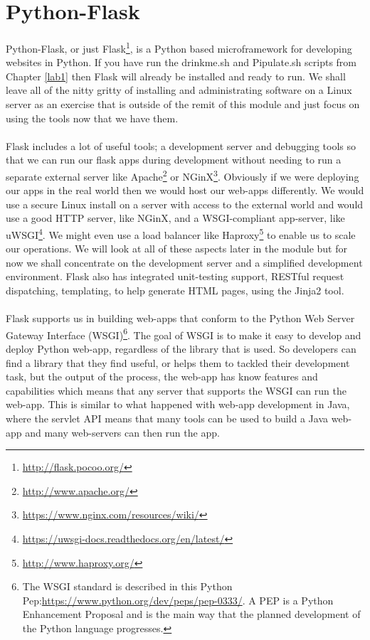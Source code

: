 \documentclass[12pt, a4paper, twoside]{book}
\begin{document}
\section{Python-Flask}
\label{python-flask}
\paragraph{} Python-Flask, or just Flask\footnote{\url{http://flask.pocoo.org/}}, is a Python based microframework for developing websites in Python. If you have run the drinkme.sh and Pipulate.sh scripts from Chapter \ref{lab1} then Flask will already be installed and ready to run. We shall leave all of the nitty gritty of installing and administrating software on a Linux server as an exercise that is outside of the remit of this module and just focus on using the tools now that we have them.

\paragraph{} Flask includes a lot of useful tools; a development server and debugging tools so that we can run our flask apps during development without needing to run a separate external server like Apache\footnote{\url{http://www.apache.org/}} or NGinX\footnote{\url{https://www.nginx.com/resources/wiki/}}. Obviously if we were deploying our apps in the real world then we would host our web-apps differently. We would use a secure Linux install on a server with access to the external world and would use a good HTTP server, like NGinX, and a WSGI-compliant app-server, like uWSGI\footnote{\url{https://uwsgi-docs.readthedocs.org/en/latest/}}. We might even use a load balancer like Haproxy\footnote{\url{http://www.haproxy.org/}} to enable us to scale our operations. We will look at all of these aspects later in the module but for now we shall concentrate on the development server and a simplified development environment. Flask also has integrated unit-testing support, RESTful request dispatching, templating, to help generate HTML pages, using the Jinja2 tool.

\paragraph{} Flask supports us in building web-apps that conform to the Python Web Server Gateway Interface (WSGI)\footnote{The WSGI standard is described in this Python Pep:\url{https://www.python.org/dev/peps/pep-0333/}. A PEP is a Python Enhancement Proposal and is the main way that the planned development of the Python language progresses.}. The goal of WSGI is to make it easy to develop and deploy Python web-app, regardless of the library that is used. So developers can find a library that they find useful, or helps them to tackled their development task, but the output of the process, the web-app has know features and capabilities which means that any server that supports the WSGI can run the web-app. This is similar to what happened with web-app development in Java, where the servlet API means that many tools can be used to build a Java web-app and many web-servers can then run the app.
\end{document}
